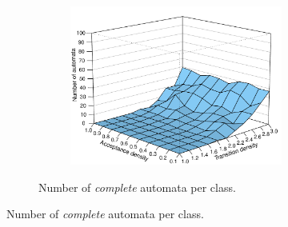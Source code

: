 \renewcommand{\tabcolsep}{0.05cm}   %
\renewcommand{\arraystretch}{1.05}
\begin{figure}[htb!]
  \centering
  \begin{subfigure}{\textwidth}
    \begin{subtable}{0.47\textwidth}
    
    \end{subtable}
    \hfill
    \begin{subfigure}{0.52\textwidth}
    \includegraphics[width=\textwidth]{../results/figures/testset/compl.persp.pdf}
    \end{subfigure}
  \caption{Number of \textit{complete} automata per class.}
  \end{subfigure}


\end{figure}
